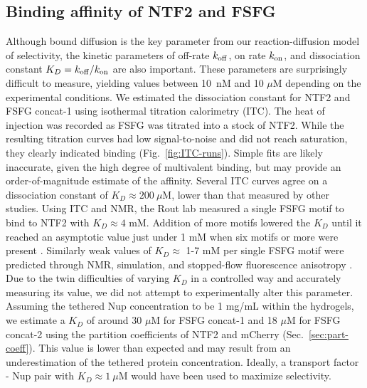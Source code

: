 \subsection{Binding affinity of NTF2 and FSFG}
Although bound diffusion is the key parameter from our reaction-diffusion model of selectivity, the kinetic parameters of off-rate $k_{\rm off}$, on rate $k_{\rm on}$, and dissociation constant $K_D = k_{\rm off}/k_{\rm on}$ are also important. These parameters are surprisingly difficult to measure, yielding values between 10~nM and 10 $\mu$M depending on the experimental conditions.  We estimated the dissociation constant for NTF2 and FSFG concat-1 using isothermal titration calorimetry (ITC).  The heat of injection was recorded as FSFG was titrated into a stock of NTF2.  While the resulting titration curves had low signal-to-noise and did not reach saturation, they clearly indicated binding (Fig.~\ref{fig:ITC-runs}).  Simple fits are likely inaccurate, given the high degree of multivalent binding, but may provide an order-of-magnitude estimate of the affinity.  Several ITC curves agree on a dissociation constant of $K_D \approx 200 \ \mu$M, lower than that measured by other studies.  Using ITC and NMR, the Rout lab measured a single FSFG motif to bind to NTF2 with $K_D\approx 4$ mM.  Addition of more motifs lowered the $K_D$ until it reached an asymptotic value just under 1 mM when six motifs or more were present \cite{hayama18}.   Similarly weak values of $K_D \approx$ 1-7 mM per single FSFG motif were predicted through NMR, simulation, and stopped-flow fluorescence anisotropy \cite{milles15}.  Due to the twin difficulties of varying $K_D$ in a controlled way and accurately measuring its value, we did not attempt to experimentally alter this parameter.  Assuming the tethered Nup concentration to be 1 mg/mL within the hydrogels, we estimate a $K_D$ of around 30 $\mu$M for FSFG concat-1 and 18 $\mu$M for FSFG concat-2 using the partition coefficients of NTF2 and mCherry (Sec.~\ref{sec:part-coeff}).  This value is lower than expected and may result from an underestimation of the tethered protein concentration.  Ideally, a transport factor - Nup pair with $K_D \approx 1\ \mu$M would have been used to maximize selectivity.

